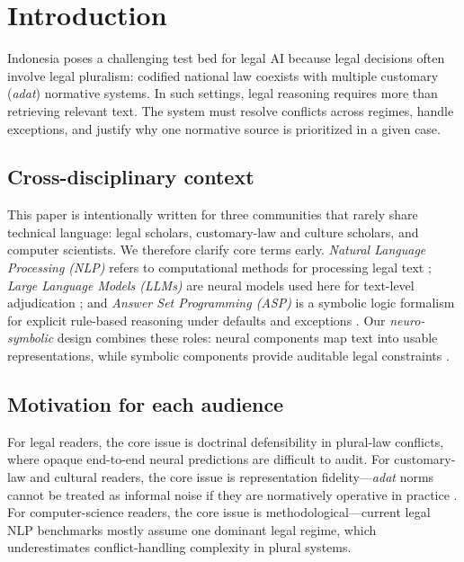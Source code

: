 \documentclass[pdflatex,sn-basic,Numbered]{sn-jnl}
\begin{document}
\maketitle

\section{Introduction}\label{sec:intro}

Indonesia poses a challenging test bed for legal AI because legal decisions often involve legal pluralism: codified national law coexists with multiple customary (\textit{adat}) normative systems.
In such settings, legal reasoning requires more than retrieving relevant text.
The system must resolve conflicts across regimes, handle exceptions, and justify why one normative source is prioritized in a given case.

\subsection{Cross-disciplinary context}\label{subsec:crossdisc}

This paper is intentionally written for three communities that rarely share technical language: legal scholars, customary-law and culture scholars, and computer scientists.
We therefore clarify core terms early.
\textit{Natural Language Processing (NLP)} refers to computational methods for processing legal text \cite{guha2023legalbench}; \textit{Large Language Models (LLMs)} are neural models used here for text-level adjudication \cite{brown2020language}; and \textit{Answer Set Programming (ASP)} is a symbolic logic formalism for explicit rule-based reasoning under defaults and exceptions \cite{lifschitz2019asp,gebser2014clingo}.
Our \textit{neuro-symbolic} design combines these roles: neural components map text into usable representations, while symbolic components provide auditable legal constraints \cite{garcez2023neurosymbolic}.

\subsection{Motivation for each audience}\label{subsec:motivation}

For legal readers, the core issue is doctrinal defensibility in plural-law conflicts, where opaque end-to-end neural predictions are difficult to audit.
For customary-law and cultural readers, the core issue is representation fidelity---\textit{adat} norms cannot be treated as informal noise if they are normatively operative in practice \cite{hooker1978adat,burns2004leiden}.
For computer-science readers, the core issue is methodological---current legal NLP benchmarks mostly assume one dominant legal regime, which underestimates conflict-handling complexity in plural systems.
\end{document}
